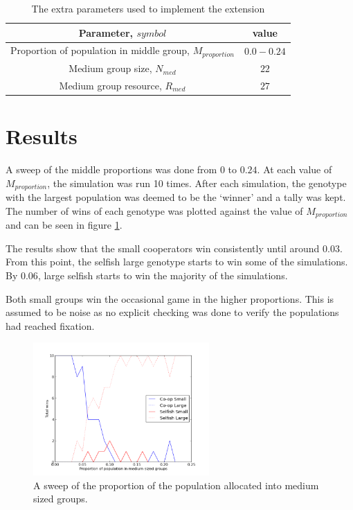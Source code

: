 \documentclass[11pt]{ecsarticle}
\begin{document}
\begin{table}[b]
\centering
 \caption{The extra parameters used to implement the extension}
 \label{table:extparams}
 \begin{tabular}{|c|c|}\hline
  Parameter, $symbol$ & value \\ \hline 
  Proportion of population in middle group, $M_{proportion}$ & $0.0 - 0.24$ \\ 
  Medium group size, $N_{med}$ & $22$ \\
  Medium group resource, $R_{med}$ & $27$ \\ \hline
 \end{tabular}
\end{table}


\section{Results}\label{sc:results}

A sweep of the middle proportions was done from $0$ to $0.24$. 
At each value of $M_{proportion}$, the simulation was run 10 times.
After each simulation, the genotype with the largest population was deemed to be the `winner' and a tally was kept. 
The number of wins of each genotype was plotted against the value of $M_{proportion}$ and can be seen in figure \ref{fig:extresult}.

The results show that the small cooperators win consistently until around $0.03$. 
From this point, the selfish large genotype starts to win some of the simulations. 
By $0.06$, large selfish starts to win the majority of the simulations.

Both small groups win the occasional game in the higher proportions. 
This is assumed to be noise as no explicit checking was done to verify the populations had reached fixation. 

\begin{figure}
 \centering
 \includegraphics[width=0.6\textwidth]{Code2/extresults.png}
 \caption{A sweep of the proportion of the population allocated into medium sized groups.}
 \label{fig:extresult}
\end{figure}
\end{document}
